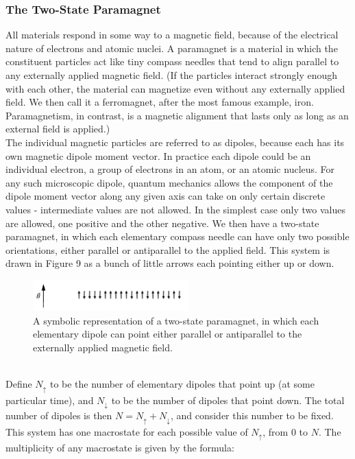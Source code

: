\documentclass[11pt]{exam}
\begin{document}
\subsubsection*{The Two-State Paramagnet}
All materials respond in some way to a magnetic field, because of the electrical nature of electrons and atomic nuclei. A paramagnet is a material in which the constituent particles act like tiny compass needles that tend to align parallel to any externally applied magnetic field. (If the particles interact strongly enough with each other, the material can magnetize even without any externally applied field. We then call it a ferromagnet, after the most famous example, iron. Paramagnetism, in contrast, is a magnetic alignment that lasts only as long as an external field is applied.)\\
\hspace*{10mm}The individual magnetic particles are referred to as dipoles, because each has its own magnetic dipole moment vector. In practice each dipole could be an individual electron, a group of electrons in an atom, or an atomic nucleus. For any such microscopic dipole, quantum mechanics allows the component of the dipole moment vector along any given axis can take on only certain discrete values - intermediate values are not allowed. In the simplest case only two values are allowed, one positive and the other negative. We then have a two-state paramagnet, in which each elementary compass needle can have only two possible orientations, either parallel or antiparallel to the applied field. This system is drawn in Figure 9 as a bunch of little arrows each pointing either up or down. 
\begin{figure}[htp]
    \centering
    \includegraphics[width=6cm]{2statePara.png}
    \caption{A symbolic representation of a two-state paramagnet, in which each elementary dipole can point either parallel or antiparallel to the externally applied magnetic field.}
\label{fig:two-state-paramagnet}
\end{figure}\\
\hspace*{10mm}Define $N_{\uparrow}$ to be the number of elementary dipoles that point up (at some particular time), and $N_{\downarrow}$ to be the number of dipoles that point down. The total number of dipoles is then $N=N_{\uparrow} + N_{\downarrow}$, and consider this number to be fixed. This system has one macrostate for each possible value of $N_{\uparrow}$, from $0$ to $N$. The multiplicity of any macrostate is given by the formula:
\end{document}
